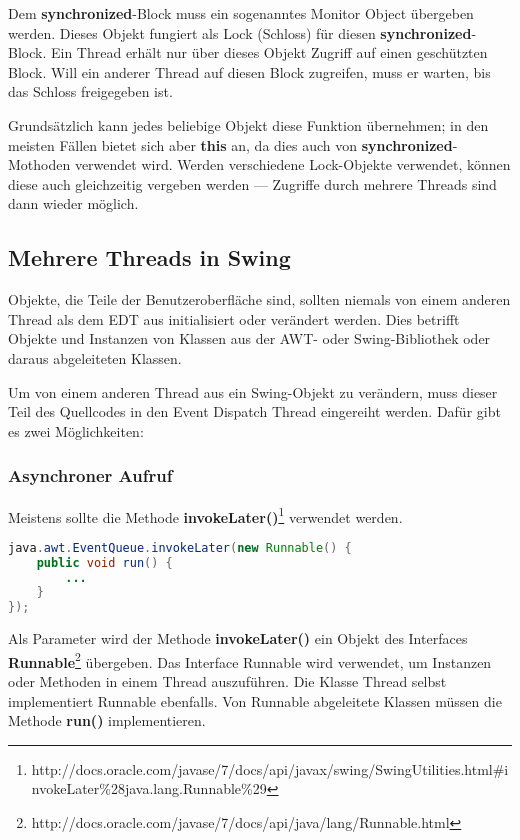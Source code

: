 Dem \textbf{synchronized}-Block muss ein sogenanntes \glqq{}Monitor Object\grqq{} übergeben werden. Dieses Objekt fungiert als \glqq{}Lock\grqq{} (Schloss) für diesen \textbf{synchronized}-Block. Ein Thread erhält nur über dieses Objekt Zugriff auf einen geschützten Block. Will ein anderer Thread auf diesen Block zugreifen, muss er warten, bis das \glqq{}Schloss\grqq{} freigegeben ist.

Grundsätzlich kann jedes beliebige Objekt diese Funktion übernehmen; in den meisten Fällen bietet sich aber \textbf{this} an, da dies auch von \textbf{synchronized}-Mothoden verwendet wird. Werden verschiedene Lock-Objekte verwendet, können diese auch gleichzeitig vergeben werden --- Zugriffe durch mehrere Threads sind dann wieder möglich.

\subsection{Mehrere Threads in Swing}

Objekte, die Teile der Benutzeroberfläche sind, sollten niemals von einem anderen Thread  als dem EDT aus initialisiert oder verändert werden. Dies betrifft Objekte und Instanzen von Klassen aus der AWT- oder Swing-Bibliothek oder daraus abgeleiteten Klassen.%

Um von einem anderen Thread aus ein Swing-Objekt zu verändern, muss dieser Teil des Quellcodes in den Event Dispatch Thread eingereiht werden. Dafür gibt es zwei Möglichkeiten:

\subsubsection*{Asynchroner Aufruf}
Meistens sollte die Methode \textbf{invokeLater()}\footnote{http://docs.oracle.com/javase/7/docs/api/javax/swing/SwingUtilities.html\#invokeLater\%28java.lang.Runnable\%29} verwendet werden.
\begin{lstlisting}[language=JAVA]
java.awt.EventQueue.invokeLater(new Runnable() {
	public void run() {
		...
	}
});
\end{lstlisting}
	Als Parameter wird der Methode \textbf{invokeLater()} ein Objekt des Interfaces \textbf{Runnable}\footnote{http://docs.oracle.com/javase/7/docs/api/java/lang/Runnable.html} übergeben. Das Interface Runnable wird verwendet, um Instanzen oder Methoden in einem Thread auszuführen. Die Klasse Thread selbst implementiert Runnable ebenfalls. Von Runnable abgeleitete Klassen müssen die Methode \textbf{run()} implementieren.
	
